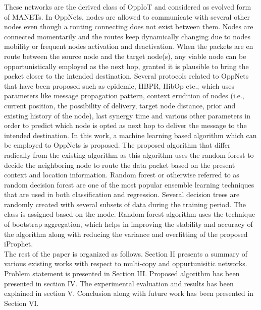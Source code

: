 \documentclass[10pt,journal]{IEEEtran}
\begin{document}
These networks  are the derived class of OppIoT and considered as evolved form of MANETs. In OppNets, nodes are allowed to communicate with several other nodes even though a routing connecting does not exist between them. Nodes are connected momentarily and the routes keep dynamically changing due to nodes mobility or  frequent nodes activation and deactivation. When the packets are en route between the source node and the target node(s), any viable node can be opportunistically employed as the next hop, granted it is plausible to bring the packet closer to the intended destination. 
Several protocols related to OppNets that have been proposed such as epidemic, HBPR, HibOp etc., which uses parameters like message propagation pattern, context erudition of nodes (i.e., current position, the possibility of delivery, target node distance, prior and existing history of the node), last synergy  time and various other parameters in order to predict which node is opted  as next hop to deliver the message to the intended destination. In this work, a  machine learning based algorithm which can be employed to OppNets is proposed. The proposed algorithm that differ radically from the existing algorithm as this algorithm uses  the random forest to decide the neighboring node to route the data packet based on the present context and location information. Random forest or otherwise referred to as random decision forest are one of the most popular ensemble learning techniques that are used in both classification and regression. Several decision trees are randomly created with several subsets of data during the training period. The class is assigned based on the mode. Random forest algorithm uses the technique of bootstrap aggregation, which helps in improving the stability and accuracy of the algorithm along with reducing the variance and overfitting of the proposed iProphet. \\
The rest of the paper is organized as follows. Section II presents a summary of various existing works with
respect to multi-copy and oppurtunisitic networks. Problem statement is presented in Section III. Proposed algorithm has been presented in section IV. The experimental evaluation and results has been explained in section V. Conclusion along with future work has been presented in Section VI. 
\end{document}
